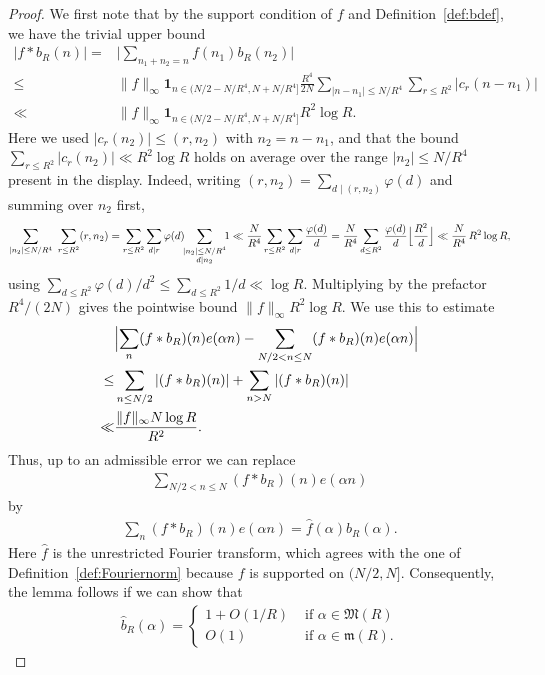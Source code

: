 \documentclass[12pt]{amsart}
\theoremstyle{definition}
\theoremstyle{remark}
\numberwithin{equation}{section}
\newcommand{\1}{\mathbf{1}}
\begin{document}
\begin{proof}
We first note that by the support condition of $f$ and Definition~\ref{def:bdef}, we have the trivial upper bound
\begin{align*}
    |f*b_R(n)|=&\bigl| \sum_{n_1+n_2=n}f(n_1) b_R(n_2) \bigr|\\
    \leq & \|f\|_\infty \1_{n\in (N/2-N/R^4,N+N/R^4]} \frac{R^4}{2N} \sum_{|n-n_1|\leq N/R^4} \sum_{r\leq R^2} |c_r(n-n_1)|\\
    \ll & \|f\|_\infty \1_{n\in (N/2-N/R^4,N+N/R^4]}R^2 \log R.
\end{align*}
Here we used $|c_r(n_2)|\leq (r,n_2)$ with $n_2=n-n_1$, and that the bound $\sum_{r\leq R^2}|c_r(n_2)|\ll R^2\log R$ holds on average over the range $|n_2|\leq N/R^4$ present in the display. Indeed, writing $(r,n_2)=\sum_{d\mid (r,n_2)}\varphi(d)$ and summing over $n_2$ first,
\begin{align*}
\sum_{|n_2|\leq N/R^4}\ \sum_{r\leq R^2}(r,n_2)
=\sum_{r\leq R^2}\sum_{d\mid r}\varphi(d)\!\!\sum_{\substack{|n_2|\leq N/R^4\\ d\mid n_2}}\!\!1
\ll \frac{N}{R^4}\sum_{r\leq R^2}\sum_{d\mid r}\frac{\varphi(d)}{d}
= \frac{N}{R^4}\sum_{d\leq R^2}\frac{\varphi(d)}{d}\Bigl\lfloor\frac{R^2}{d}\Bigr\rfloor
\ll \frac{N}{R^4}\,R^2\log R,
\end{align*}
using $\sum_{d\leq R^2}\varphi(d)/d^2\leq\sum_{d\leq R^2}1/d\ll\log R$. Multiplying by the prefactor $R^4/(2N)$ gives the pointwise bound $\|f\|_\infty R^2\log R$.
We use this to estimate
\begin{align*}
   &\Bigl|\sum_{n}(f*b_R)(n)e(\alpha n)-\sum_{N/2<n\leq N}(f*b_R)(n)e(\alpha n)\Bigr|\\
   \leq& \sum_{n\leq N/2}|(f*b_R)(n)|+\sum_{n>N}|(f*b_R)(n)|\\
  \ll&  \frac{\|f\|_\infty N \log R}{R^2}.
\end{align*}
Thus, up to an admissible error we can replace 
\begin{align*}
    \sum_{N/2<n\leq N} (f*b_R)(n)e(\alpha n)
\end{align*}
by 
\begin{align*}
    \sum_{n} (f*b_R)(n)e(\alpha n)=\widehat{f}(\alpha) \widehat{b}_R(\alpha).
\end{align*}
Here $\widehat{f}$ is the unrestricted Fourier transform, which agrees with the one of Definition~\ref{def:Fouriernorm} because $f$ is supported on $(N/2,N]$.
Consequently, the lemma follows if we can show that
    \begin{align}\label{eq_bresult}
	   \widehat{b}_R(\alpha)=\begin{cases}1+O(1/R) &\text{ if } \alpha \in \mathfrak{M}(R)\\
		O(1) &\text{ if } \alpha \in \mathfrak{m}(R).
	\end{cases}
	\end{align}
	

\end{proof}
\end{document}
